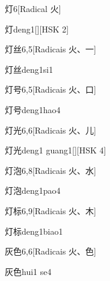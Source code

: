 \begin{entry}{灯}{6}[Radical ⽕]
  \begin{phonetics}{灯}{deng1}[][HSK 2]
  \end{phonetics}
\end{entry}

\begin{entry}{灯丝}{6,5}[Radicais ⽕、⼀]
  \begin{phonetics}{灯丝}{deng1si1}
  \end{phonetics}
\end{entry}

\begin{entry}{灯号}{6,5}[Radicais ⽕、⼝]
  \begin{phonetics}{灯号}{deng1hao4}
  \end{phonetics}
\end{entry}

\begin{entry}{灯光}{6,6}[Radicais ⽕、⼉]
  \begin{phonetics}{灯光}{deng1 guang1}[][HSK 4]
  \end{phonetics}
\end{entry}

\begin{entry}{灯泡}{6,8}[Radicais ⽕、⽔]
  \begin{phonetics}{灯泡}{deng1pao4}
  \end{phonetics}
\end{entry}

\begin{entry}{灯标}{6,9}[Radicais ⽕、⽊]
  \begin{phonetics}{灯标}{deng1biao1}
  \end{phonetics}
\end{entry}

\begin{entry}{灰色}{6,6}[Radicais ⽕、⾊]
  \begin{phonetics}{灰色}{hui1 se4}
  \end{phonetics}
\end{entry}

